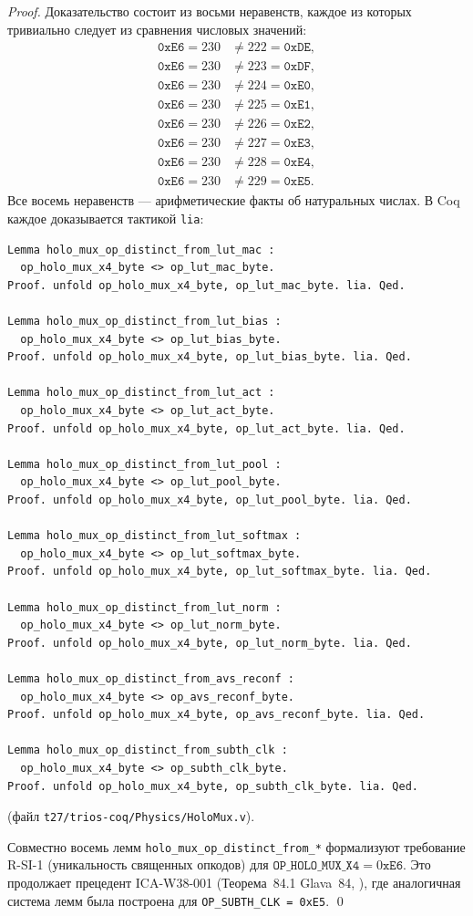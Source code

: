\begin{proof}
Доказательство состоит из восьми неравенств, каждое из которых
тривиально следует из сравнения числовых значений:
\begin{align*}
  \texttt{0xE6} = 230 &\neq 222 = \texttt{0xDE}, \\
  \texttt{0xE6} = 230 &\neq 223 = \texttt{0xDF}, \\
  \texttt{0xE6} = 230 &\neq 224 = \texttt{0xE0}, \\
  \texttt{0xE6} = 230 &\neq 225 = \texttt{0xE1}, \\
  \texttt{0xE6} = 230 &\neq 226 = \texttt{0xE2}, \\
  \texttt{0xE6} = 230 &\neq 227 = \texttt{0xE3}, \\
  \texttt{0xE6} = 230 &\neq 228 = \texttt{0xE4}, \\
  \texttt{0xE6} = 230 &\neq 229 = \texttt{0xE5}.
\end{align*}
Все восемь неравенств — арифметические факты об натуральных числах.
В Coq каждое доказывается тактикой \texttt{lia}:
\begin{lstlisting}[language=Coq]
Lemma holo_mux_op_distinct_from_lut_mac :
  op_holo_mux_x4_byte <> op_lut_mac_byte.
Proof. unfold op_holo_mux_x4_byte, op_lut_mac_byte. lia. Qed.

Lemma holo_mux_op_distinct_from_lut_bias :
  op_holo_mux_x4_byte <> op_lut_bias_byte.
Proof. unfold op_holo_mux_x4_byte, op_lut_bias_byte. lia. Qed.

Lemma holo_mux_op_distinct_from_lut_act :
  op_holo_mux_x4_byte <> op_lut_act_byte.
Proof. unfold op_holo_mux_x4_byte, op_lut_act_byte. lia. Qed.

Lemma holo_mux_op_distinct_from_lut_pool :
  op_holo_mux_x4_byte <> op_lut_pool_byte.
Proof. unfold op_holo_mux_x4_byte, op_lut_pool_byte. lia. Qed.

Lemma holo_mux_op_distinct_from_lut_softmax :
  op_holo_mux_x4_byte <> op_lut_softmax_byte.
Proof. unfold op_holo_mux_x4_byte, op_lut_softmax_byte. lia. Qed.

Lemma holo_mux_op_distinct_from_lut_norm :
  op_holo_mux_x4_byte <> op_lut_norm_byte.
Proof. unfold op_holo_mux_x4_byte, op_lut_norm_byte. lia. Qed.

Lemma holo_mux_op_distinct_from_avs_reconf :
  op_holo_mux_x4_byte <> op_avs_reconf_byte.
Proof. unfold op_holo_mux_x4_byte, op_avs_reconf_byte. lia. Qed.

Lemma holo_mux_op_distinct_from_subth_clk :
  op_holo_mux_x4_byte <> op_subth_clk_byte.
Proof. unfold op_holo_mux_x4_byte, op_subth_clk_byte. lia. Qed.
\end{lstlisting}
(файл \texttt{t27/trios-coq/Physics/HoloMux.v}).

Совместно восемь лемм \texttt{holo\_mux\_op\_distinct\_from\_*}
формализуют требование R-SI-1 (уникальность священных опкодов)
для $\texttt{OP\_HOLO\_MUX\_X4} = 0\texttt{xE6}$.
Это продолжает прецедент ICA-W38-001 (Теорема~84.1 Glava~84,
\cite{trios871,trios877}), где аналогичная система лемм была построена
для \texttt{OP\_SUBTH\_CLK = 0xE5}.
\qed
\end{proof}

